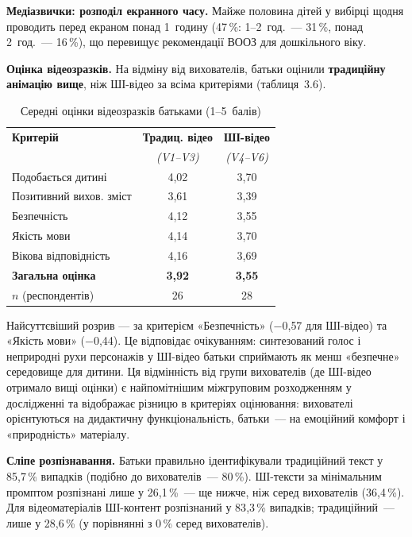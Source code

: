 \documentclass[14pt, a4paper]{extreport}
\begin{document}
\textbf{Медіазвички: розподіл екранного часу.} Майже половина дітей у вибірці щодня проводить перед екраном понад 1~годину (47\,\%: 1--2~год.~--- 31\,\%, понад 2~год.~--- 16\,\%), що перевищує рекомендації ВООЗ для дошкільного віку.

\textbf{Оцінка відеозразків.} На відміну від вихователів, батьки оцінили \textbf{традиційну анімацію вище}, ніж ШІ-відео за всіма критеріями (таблиця~3.6).

\begin{table}[htbp]
\caption{Середні оцінки відеозразків батьками (1--5~балів)}
\centering
\begin{tabular}{|l|c|c|}
\hline
\rowcolor{tblhead}\textbf{Критерій} & \textbf{Традиц. відео} & \textbf{ШІ-відео} \\
\rowcolor{tblhead} & \textit{(V1--V3)} & \textit{(V4--V6)} \\
\hline
Подобається дитині          & 4{,}02 & 3{,}70 \\
Позитивний вихов. зміст     & 3{,}61 & 3{,}39 \\
Безпечність                 & 4{,}12 & 3{,}55 \\
Якість мови                 & 4{,}14 & 3{,}70 \\
Вікова відповідність        & 4{,}16 & 3{,}69 \\
\textbf{Загальна оцінка}    & \textbf{3{,}92} & \textbf{3{,}55} \\
\hline
$n$ (респондентів) & 26 & 28 \\
\hline
\end{tabular}
\end{table}

Найсуттєвіший розрив --- за критерієм «Безпечність» ($-$0{,}57 для ШІ-відео) та «Якість мови» ($-$0{,}44). Це відповідає очікуванням: синтезований голос і неприродні рухи персонажів у ШІ-відео батьки сприймають як менш «безпечне» середовище для дитини. Ця відмінність від групи вихователів (де ШІ-відео отримало вищі оцінки) є найпомітнішим міжгруповим розходженням у дослідженні та відображає різницю в критеріях оцінювання: вихователі орієнтуються на дидактичну функціональність, батьки~--- на емоційний комфорт і «природність» матеріалу.

\textbf{Сліпе розпізнавання.} Батьки правильно ідентифікували традиційний текст у 85{,}7\,\% випадків (подібно до вихователів~--- 80\,\%). ШІ-тексти за мінімальним промптом розпізнані лише у 26{,}1\,\%~--- ще нижче, ніж серед вихователів (36{,}4\,\%). Для відеоматеріалів ШІ-контент розпізнаний у 83{,}3\,\% випадків; традиційний~--- лише у 28{,}6\,\% (у порівнянні з 0\,\% серед вихователів).
\end{document}
